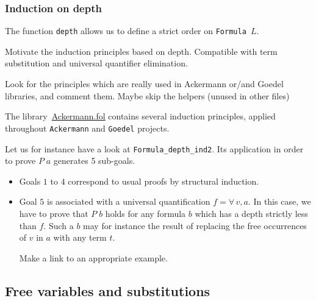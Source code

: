 
\subsubsection{Induction on depth}

The function \texttt{depth} allows us to define a strict order on 
\texttt{Formula $L$}.



\begin{todo}
Motivate the induction principles based on depth. Compatible with term substitution and universal quantifier elimination.
\end{todo}




\begin{todo}
 Look for the principles which are really used in Ackermann or/and Goedel libraries, and comment them.
 Maybe skip the helpers (unused in other files)
\end{todo}

The library~\href{../theories/html/hydras.Ackermann.fol.html}{Ackermann.fol} contains several induction principles, applied 
throughout \texttt{Ackermann} and \texttt{Goedel} projects.


Let us for instance have a look  at \texttt{Formula\_depth\_ind2}. Its application in order to prove $P\;a$ generates 5 sub-goals. 


\begin{itemize}
\item Goals $1$ to $4$ correspond to  usual proofs by structural induction.
\item Goal $5$ is associated with a universal quantification $f=\forall\,v,a$. In this case, we have to prove that $P\;b$ holds for any formula $b$ which has a depth strictly less than $f$. Such a $b$ may for instance the result of replacing the free occurrences of $v$ in $a$ with any term $t$.
  \begin{todo}
   Make a link to an appropriate example.
  \end{todo}
\end{itemize}



\subsection{Free variables and substitutions}

